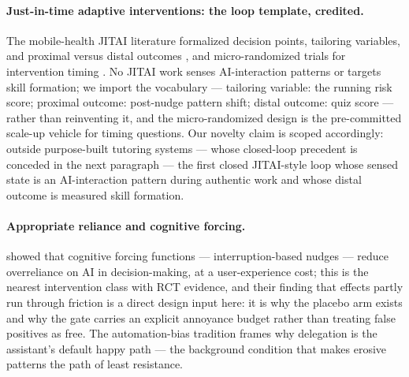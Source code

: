 \documentclass[11pt]{article}
\begin{document}
\paragraph{Just-in-time adaptive interventions: the loop template, credited.}
The mobile-health JITAI literature formalized decision points, tailoring variables, and proximal versus distal outcomes \citep{nahumshani2018jitai}, and micro-randomized trials for intervention timing \citep{klasnja2015mrt}. No JITAI work senses AI-interaction patterns or targets skill formation; we import the vocabulary --- tailoring variable: the running risk score; proximal outcome: post-nudge pattern shift; distal outcome: quiz score --- rather than reinventing it, and the micro-randomized design is the pre-committed scale-up vehicle for timing questions. Our novelty claim is scoped accordingly: outside purpose-built tutoring systems --- whose closed-loop precedent is conceded in the next paragraph --- the first closed JITAI-style loop whose sensed state is an AI-interaction pattern during authentic work and whose distal outcome is measured skill formation.

\paragraph{Appropriate reliance and cognitive forcing.}
\citet{bucinca2021trust} showed that cognitive forcing functions --- interruption-based nudges --- reduce overreliance on AI in decision-making, at a user-experience cost; this is the nearest intervention class with RCT evidence, and their finding that effects partly run through friction is a direct design input here: it is why the placebo arm exists and why the gate carries an explicit annoyance budget rather than treating false positives as free. The automation-bias tradition \citep{lee2004trust} frames why delegation is the assistant's default happy path --- the background condition that makes erosive patterns the path of least resistance.
\end{document}
